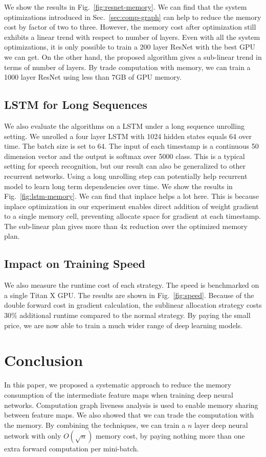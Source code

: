 We show the results in Fig.~\ref{fig:resnet-memory}.
We can find that the system optimizations introduced in Sec.~\ref{sec:comp-graph} can help to reduce the memory cost by factor of two to three. However, the memory cost after optimization still exhibits a linear trend with respect to number of layers. Even with all the system optimizations, it is only possible to train a 200 layer ResNet with the best GPU we can get. On the other hand, the proposed algorithm gives a sub-linear trend in terms of number of layers. By trade computation with memory, we can train a 1000 layer ResNet using less than 7GB of GPU memory.

\subsection{LSTM for Long Sequences}

We also evaluate the algorithms on a LSTM under a long sequence unrolling setting. We unrolled a four layer LSTM with 1024 hidden states equals 64 over time. The batch size is set to 64. The input of each timestamp is a continuous 50 dimension vector and the output is softmax over 5000 class. This is a typical setting for speech recognition\cite{DBLP:conf/interspeech/SakSB14}, but our result can also be generalized to other recurrent networks. Using a long unrolling step can potentially help recurrent model to learn long term dependencies over time. We show the results in Fig.~\ref{fig:lstm-memory}.
We can find that inplace helps a lot here. This is because inplace optimization in our experiment enables direct addition of weight gradient to a single memory cell, preventing allocate space for gradient at each timestamp. The sub-linear plan gives more than 4x reduction over the optimized memory plan.

\subsection{Impact on Training Speed}

We also measure the runtime cost of each strategy. The speed is benchmarked on a single Titan X GPU. The results are shown in Fig.~\ref{fig:speed}.
Because of the double forward cost in gradient calculation, the sublinear allocation strategy costs $30$\% additional runtime compared to the normal strategy. By paying the small price, we are now able to train a much wider range of deep learning models.

\section{Conclusion}

In this paper, we proposed a systematic approach to reduce the memory consumption of the intermediate feature maps when training deep neural networks. Computation graph liveness analysis is used to enable memory sharing between feature maps. We also showed that we can trade the computation with the memory. By combining the techniques, we can train a $n$ layer deep neural network with only $O(\sqrt{n})$ memory cost, by paying nothing more than one extra forward computation per mini-batch.


